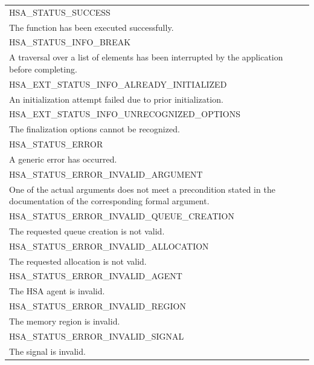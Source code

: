 \documentclass[final,oneside]{book}
\newcommand{\reftyp}[1]{#1}
\newcommand{\refenu}[1]{\reftyp{#1}}
\begin{document}
\begin{longtable}{@{\hspace{2em}}p{\linewidth-2em}}
\hspace{-2em}\refenu{HSA_\-STATUS_\-SUCCESS}\\The function has been executed successfully.\\[2mm]
\hspace{-2em}\refenu{HSA_\-STATUS_\-INFO_\-BREAK}\\A traversal over a list of elements has been interrupted by the application before completing.\\[2mm]
\hspace{-2em}\refenu{HSA_\-EXT_\-STATUS_\-INFO_\-ALREADY_\-INITIALIZED}\\An initialization attempt failed due to prior initialization.\\[2mm]
\hspace{-2em}\refenu{HSA_\-EXT_\-STATUS_\-INFO_\-UNRECOGNIZED_\-OPTIONS}\\The finalization options cannot be recognized.\\[2mm]
\hspace{-2em}\refenu{HSA_\-STATUS_\-ERROR}\\A generic error has occurred.\\[2mm]
\hspace{-2em}\refenu{HSA_\-STATUS_\-ERROR_\-INVALID_\-ARGUMENT}\\One of the actual arguments does not meet a precondition stated in the documentation of the corresponding formal argument.\\[2mm]
\hspace{-2em}\refenu{HSA_\-STATUS_\-ERROR_\-INVALID_\-QUEUE_\-CREATION}\\The requested queue creation is not valid.\\[2mm]
\hspace{-2em}\refenu{HSA_\-STATUS_\-ERROR_\-INVALID_\-ALLOCATION}\\The requested allocation is not valid.\\[2mm]
\hspace{-2em}\refenu{HSA_\-STATUS_\-ERROR_\-INVALID_\-AGENT}\\The HSA agent is invalid.\\[2mm]
\hspace{-2em}\refenu{HSA_\-STATUS_\-ERROR_\-INVALID_\-REGION}\\The memory region is invalid.\\[2mm]
\hspace{-2em}\refenu{HSA_\-STATUS_\-ERROR_\-INVALID_\-SIGNAL}\\The signal is invalid.\\[2mm]

\end{longtable}
\end{document}
